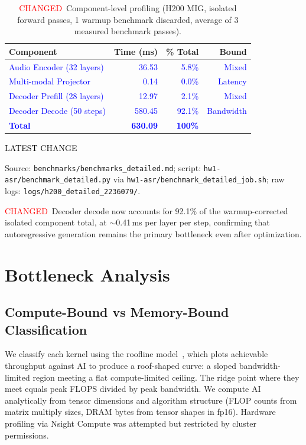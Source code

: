 \documentclass{article}
\newcommand{\chg}[1]{{\color{blue}#1}}
\newcommand{\chgcell}[1]{\textcolor{blue}{#1}}
\newcommand{\chglabel}{{\setlength{\fboxsep}{1pt}\colorbox{yellow!45}{\textcolor{red}{\scriptsize CHANGED}}}}
\newcommand{\latestchglabel}{{\setlength{\fboxsep}{1pt}\colorbox{yellow!65}{\textcolor{black}{\scriptsize LATEST CHANGE}}}}
\newcommand{\latestsource}[1]{%
  \par\noindent
  {\footnotesize \latestchglabel\ \parbox[t]{0.9\linewidth}{#1}}\par
}
\begin{document}
\begin{table}[h]
\centering
\caption{\chglabel\ \chg{Component-level profiling (H200 MIG, isolated forward passes, 1 warmup benchmark discarded, average of 3 measured benchmark passes).}}
\label{tab:detailed}
\small
\begin{tabular}{@{}lrrr@{}}
\toprule
\textbf{Component} & \textbf{Time (ms)} & \textbf{\% Total} & \textbf{Bound} \\
\midrule
\chgcell{Audio Encoder (32 layers)} & \chgcell{36.53} & \chgcell{5.8\%} & \chgcell{Mixed} \\
\chgcell{Multi-modal Projector} & \chgcell{0.14} & \chgcell{0.0\%} & \chgcell{Latency} \\
\chgcell{Decoder Prefill (28 layers)} & \chgcell{12.97} & \chgcell{2.1\%} & \chgcell{Mixed} \\
\chgcell{Decoder Decode (50 steps)} & \chgcell{580.45} & \chgcell{92.1\%} & \chgcell{Bandwidth} \\
\midrule
\chgcell{\textbf{Total}} & \chgcell{\textbf{630.09}} & \chgcell{\textbf{100\%}} & \\
\bottomrule
\end{tabular}
\end{table}

\latestsource{Source: \texttt{benchmarks/benchmarks\_detailed.md}; script: \texttt{hw1-asr/benchmark\_detailed.py} via \texttt{hw1-asr/benchmark\_detailed\_job.sh}; raw logs: \texttt{logs/h200\_detailed\_2236079/}.}

\chglabel\ \chg{Decoder decode now accounts for 92.1\% of the warmup-corrected isolated component total, at $\sim$0.41\,ms per layer per step, confirming that autoregressive generation remains the primary bottleneck even after optimization.}

\section{Bottleneck Analysis}\label{sec:bottleneck}

\subsection{Compute-Bound vs Memory-Bound Classification}

We classify each kernel using the roofline model~\citep{williams2009roofline}, which plots achievable throughput against AI to produce a roof-shaped curve: a sloped bandwidth-limited region meeting a flat compute-limited ceiling.  The ridge point where they meet equals peak FLOPS divided by peak bandwidth.  We compute AI analytically from tensor dimensions and algorithm structure (FLOP counts from matrix multiply sizes, DRAM bytes from tensor shapes in fp16).  Hardware profiling via Nsight Compute was attempted but restricted by cluster permissions.
\end{document}
